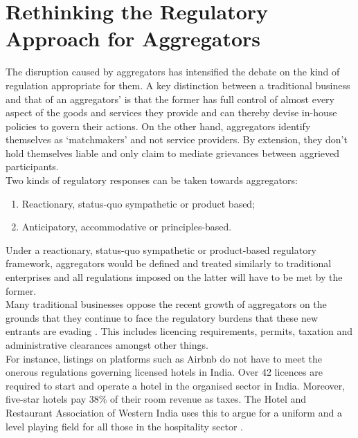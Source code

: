 \documentclass[a4paper, 12pt]{article}
\begin{document}
\section{Rethinking the Regulatory Approach for Aggregators}
The disruption caused by aggregators has intensified the debate on the kind of regulation appropriate for them. A key distinction between a traditional business and that of an aggregators’ is that the former has full control of almost every aspect of the goods and services they provide and can thereby devise in-house policies to govern their actions. On the other hand, aggregators identify themselves as ‘matchmakers’ and not service providers. By extension, they don't hold themselves liable and only claim to mediate grievances between aggrieved participants. \\
          
             Two kinds of regulatory responses can be taken towards aggregators:         
                    \begin{enumerate}
                      \item  Reactionary, status-quo sympathetic or product based;
                      \item Anticipatory, accommodative or principles-based.
                    \end{enumerate}
                    
                 Under a reactionary, status-quo sympathetic or product-based regulatory framework, aggregators would be defined and treated similarly to traditional enterprises and all regulations imposed on the latter will have to be met by the former. \\
                 
Many traditional businesses oppose the recent growth of aggregators on the grounds that they continue to face the regulatory burdens that these new entrants are evading \parencite{koopman2014sharing}. This includes licencing requirements, permits, taxation and administrative clearances amongst other things. \\

For instance, listings on platforms such as Airbnb do not have to meet the onerous regulations governing licensed hotels in India. Over 42 licences are required to start and operate a hotel in the organised sector in India. Moreover, five-star hotels pay 38\% of their room revenue as taxes. The Hotel and Restaurant Association of Western India uses this to argue for a uniform and a level playing field for all those in the hospitality sector \parencite{Chaturvedinews}.\\
\end{document}
